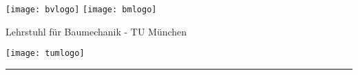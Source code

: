 \thispagestyle{empty}
\newlength{\headsepold}
\setlength{\headsepold}{\headsep}
\setlength{\headsep}{-1.0cm}
\begin{center}
{\sffamily
\fontsize{18}{18}\selectfont 
\texttt{[image: bvlogo]} \texttt{[image: bmlogo]} \hfill 
	\begin{minipage}[b]{80mm}
 \small \centering Lehrstuhl f{\"u}r Baumechanik - TU M{\"u}nchen \\ \lehrer
  \end{minipage}
 \hfill \texttt{[image: tumlogo]}
\vspace{0.5cm}
\hrule
\begin{center}
\vspace{5cm}
{\Large \textbf { \veranstaltung }}\\[4 pt]
\vspace{0.5cm}
{\normalsize \semester}\\
\end{center}
}
\end{center}
\enlargethispage{3.5cm}
\vfill
\newpage
\setlength{\headsep}{\headsepold}